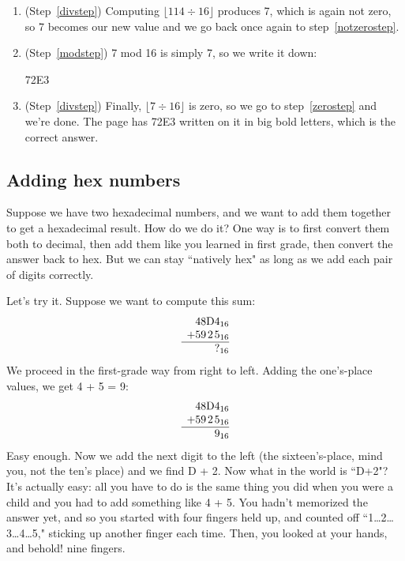 \begin{enumerate}
\item (Step~\ref{divstep}) Computing $\lfloor 114 \div 16 \rfloor$ produces
7, which is again not zero, so 7 becomes our new value and we go back once
again to step~\ref{notzerostep}.

\item (Step~\ref{modstep}) 7 mod 16 is simply 7, so we write it down:

{\Large
\begin{center}
72E3
\end{center}
}

\item (Step~\ref{divstep}) Finally, $\lfloor 7 \div 16 \rfloor$ is zero, so
we go to step~\ref{zerostep} and we're done. The page has 72E3 written on
it in big bold letters, which is the correct answer.
\end{enumerate}

\subsection{Adding hex numbers}

Suppose we have two hexadecimal numbers, and we want to add them together
to get a hexadecimal result. How do we do it? One way is to first convert
them both to decimal, then add them like you learned in first grade, then
convert the answer back to hex. But we can stay ``natively hex" as long as
we add each pair of digits correctly.

Let's try it. Suppose we want to compute this sum:
\[
\begin{array}{*{5}{c@{\hspace{0pt}}}}
   &        4 &        8 & \text{D} & 4_{16} \\
 + &        5 &        9 &        2 & 5_{16} \\
\hline
   &          &          &          & ?_{16} \\
\end{array}
\]
We proceed in the first-grade way from right to left. Adding the
one's-place values, we get 4 + 5 = 9:
\[
\begin{array}{*{5}{c@{\hspace{0pt}}}}
   &        4 &        8 & \text{D} & 4_{16} \\
 + &        5 &        9 &        2 & 5_{16} \\
\hline
   &          &          &          & 9_{16} \\
\end{array}
\]
Easy enough. Now we add the next digit to the left (the sixteen's-place,
mind you, not the ten's place) and we find D + 2. Now what in the world is
``D+2"? It's actually easy: all you have to do is the same thing you did
when you were a child and you had to add something like 4 + 5. You hadn't
memorized the answer yet, and so you started with four fingers held up, and
counted off ``1\dots 2\dots 3\dots 4\dots 5," sticking up another finger
each time. Then, you looked at your hands, and behold! nine fingers.

